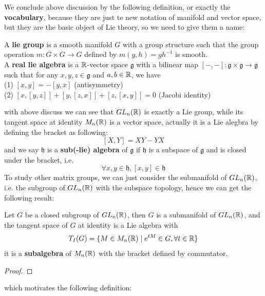 We conclude above discussion by the following definition, or exactly the \textbf{vocabulary}, because they are just te new notation of manifold and vector space, but they are the basic object of Lie theory, so we need to give them a name:
\begin{definition} 
    A \textbf{lie group} is a smooth manifold \(G\) with a group structure such that the group operation \(m: G \times G \to G\) defined by \(m(g,h) = gh^{-1}\) is smooth.\\

    A \textbf{real lie algebra} is a \(\mathbb{R}\)-vector space \(\mathfrak{g}\) with a bilinear map \([-, -]: \mathfrak{g} \times \mathfrak{g} \to \mathfrak{g}\) such that for any \(x,y,z \in \mathfrak{g}\) and \(a,b \in \mathbb{R}\), we have\\

    (1) \([x,y] = -[y,x]\) (antisymmetry)\\

    (2) \([x,[y,z]] + [y,[z,x]] + [z,[x,y]] = 0\) (Jacobi identity)
\end{definition}

with above discuss we can see that \(GL_n(\mathbb{R})\) is exactly a Lie group, while its tangent space at identity \(M_n(\mathbb{R})\) is a vector space, actually it is a Lie alegbra by defining the bracket as following:
\[[X,Y] = XY - YX\]
and we say \(\mathfrak{h}\) is a \textbf{sub(-lie) algebra} of \(\mathfrak{g}\) if \(\mathfrak{h}\) is a subspace of \(\mathfrak{g}\) and is closed under the bracket, i.e.
 \[\forall x,y \in \mathfrak{h}, [x,y] \in \mathfrak{h}\]
To study other matrix groups, we can just consider the submanifold of \(GL_n(\mathbb{R})\), i.e. the subgroup of \(GL_n(\mathbb{R})\) with the subspace topology, hence we can get the following result:

\begin{colortheorem} \label{linearliegroup}
    Let \(G\) be a closed subgroup of \(GL_n(\mathbb{R})\), then \(G\) is a submanifold of \(GL_n(\mathbb{R})\), and the tangent space of \(G\) at identity is a Lie algebra with
    \[T_I(G) = \{M \in M_n(\mathbb{R}) \mid e^{tM} \in G, \forall t \in \mathbb{R}\}\]
    it is a \textbf{subalgebra} of \(M_n(\mathbb{R})\) with the bracket defined by commutator.
\end{colortheorem}

\begin{proof}
    
\end{proof}

which motivates the following definition:


